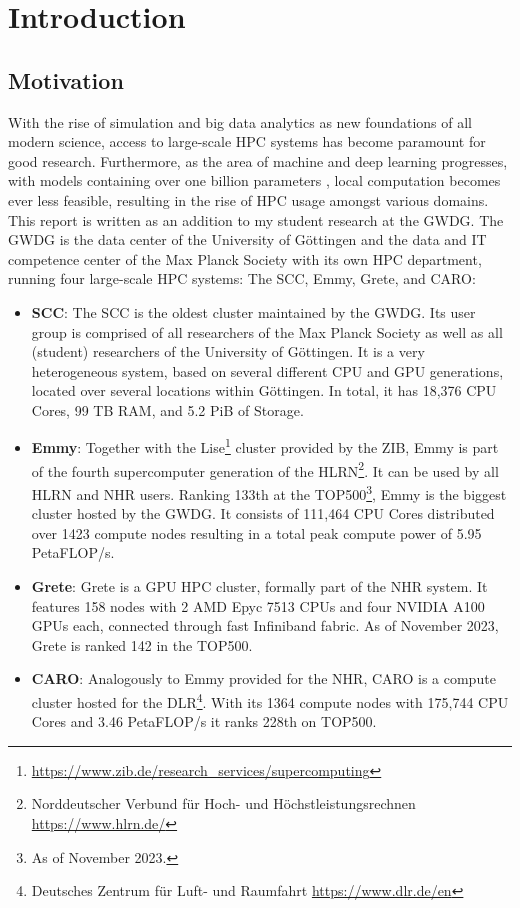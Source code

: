 \section{Introduction}
\subsection{Motivation}
With the rise of simulation and big data analytics as new foundations of all modern science,
access to large-scale \ac{HPC} systems has become paramount for good research. Furthermore,
as the area of machine and deep learning progresses, with models containing over one billion
parameters \cite{gpt4param},  local computation becomes ever less feasible, resulting in the 
rise of \ac{HPC} usage amongst various domains.\\

This report is written as an addition to my student research at the \ac{GWDG}. The \ac{GWDG} is the
data center of the University of Göttingen and the data and IT competence center of the 
Max Planck Society with its own \ac{HPC} department, running four large-scale \ac{HPC} systems:
The \ac{SCC}, Emmy, Grete, and CARO:
\begin{itemize}
\item \textbf{\ac{SCC}}\cite{SCC}: The \ac{SCC} is the oldest cluster maintained 
by the \ac{GWDG}. Its user group is comprised of all researchers of the Max Planck Society as 
well as all (student) researchers of the University of Göttingen. It is a very heterogeneous system,
based on several different CPU and GPU generations, located over several locations within 
Göttingen. In total, it has 18,376 CPU Cores, 99 TB RAM, and 5.2 PiB of Storage.
\item \textbf{Emmy}\cite{Emmy}: Together with the Lise\footnote{
\url{https://www.zib.de/research_services/supercomputing}} cluster provided by the ZIB, Emmy is 
part of  the fourth supercomputer generation of the HLRN\footnote{Norddeutscher Verbund für Hoch- 
und Höchstleistungsrechnen \url{https://www.hlrn.de/}}. It can be used by all HLRN and NHR users.
Ranking 133th at the TOP500\footnote{As of November 2023.}, Emmy is the biggest cluster hosted by
the \ac{GWDG}. It consists of 111,464 CPU Cores distributed over 1423 compute nodes resulting 
in a total peak compute power of 5.95 PetaFLOP/s.
\item \textbf{Grete}: Grete is a GPU \ac{HPC} cluster, formally part of the NHR system.
It features 158 nodes with 2 AMD Epyc 7513 CPUs and four NVIDIA A100 GPUs each, connected through fast
Infiniband fabric. As of November 2023, Grete is ranked 142 in the TOP500.
\item \textbf{CARO}\cite{CARO}: Analogously to Emmy provided for the NHR, CARO is a compute cluster
hosted for the DLR\footnote{Deutsches Zentrum für Luft- und Raumfahrt \url{https://www.dlr.de/en}}.
With its 1364 compute nodes with 175,744 CPU Cores and 3.46 PetaFLOP/s it ranks 228th on TOP500.
\end{itemize}


